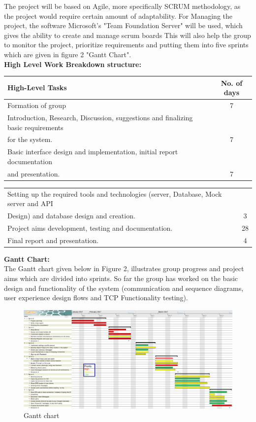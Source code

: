 \documentclass[12pt]{article}
\begin{document}
The project will be based on Agile, more specifically SCRUM methodology, as the project would require certain amount of adaptability. For Managing the project, the software Microsoft's "Team Foundation Server" will be used, which gives the ability to create and manage scrum boards This will also help the group to monitor the project,  prioritize requirements and putting them into five sprints which are given in figure 2 "Gantt Chart". \\

\textbf{High Level Work Breakdown structure:}
\begin{table}[!ht] 
\centering
\label{tab:exTable2}
\smallskip
\begin{tabular}{l c }
\hline
High-Level Tasks & No. of days\\[0.5ex]
\hline
Formation of group & 7 \\[0.5ex]
\hline
Introduction, Research, Discussion, suggestions and finalizing basic requirements \\ for the system. & 7 \\[0.5ex]
\hline
Basic interface design and implementation, initial report documentation \\ and presentation. & 7 \\[0.5ex]
\end{tabular}
\end{table}

\begin{table}[!ht] 
\centering
\label{tab:exTable2}
\smallskip
\begin{tabular}{l c }
\hline
Setting up the required tools and technologies (server, Database, Mock server and API \\ Design) and database design and creation. & 3 \\[0.5ex]
\hline
Project aims development, testing and documentation. & 28 \\[0.5ex]
\hline
Final report and presentation. & 4 \\[0.5ex]
\end{tabular}
\end{table}
\textbf{Gantt Chart:}\\
The Gantt chart given below in Figure 2, illustrates group progress and project aims which are divided into sprints. So far the group has worked on the basic design and functionality of the system (communication and sequence diagrams, user experience design flows and TCP Functionality testing).
\begin{figure}[ht!]
\centering
\includegraphics[width=1.1\textwidth]{gant_chart.png}
\caption{Gantt chart}
\label{fig:figgantt}
\end{figure}
\end{document}
